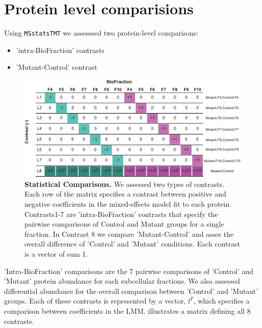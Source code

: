\documentclass[11pt]{elife}\usepackage[]{graphicx}\usepackage[]{color}
\begin{document}
\section{Protein level comparisions}

Using \texttt{MSstatsTMT} we assesssed two protein-level comparisons:

\begin{itemize}
	\item 'intra-BioFraction' contrasts 
	\item 'Mutant-Control' contrast 
\end{itemize}

\begin{figure}[hb!] %
  \begin{fullwidth}
  \begin{center}
	  \includegraphics[width=0.9\paperwidth,keepaspectratio]{contrasts}
	  \caption{\textbf{Statistical Comparisons.} We assessed two types of
	  contrasts. Each row of the matrix specifies a contrast between
	  positive and negative coefficients in the mixed-effects model fit to
	  each protein. Contrasts1-7 are 'intra-BioFraction' contrasts that
	  specify the pairwise comparisons of Control and Mutant groups for a
	  single fraction. In Contrast 8 we compare 'Mutant-Control' and asses
	  the overall difference of 'Control' and 'Mutant' conditions.  Each
	  contrast is a vector of sum 1.}
	  \label{fig:contrasts}
  \end{center}
  \end{fullwidth}
\end{figure}


'Intra-BioFraction' comparisons are the 7 pairwise comparisons of 'Control' and
'Mutant' protein abundance for each subcellular fractions. We
also assessed differential abundance for the overall comparison between 'Control'
and 'Mutant' groups. Each of these contrasts is represented by a vector, $l^T$, 
which specifies a comparison between coefficients in the LMM. 
illustrates a matrix defining all 8 contrasts. 
\end{document}

